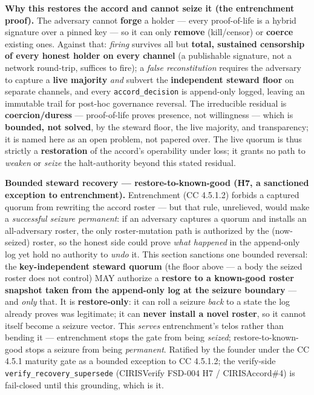 \documentclass[11pt]{article}
\begin{document}
\textbf{Why this restores the accord and cannot seize it (the entrenchment proof).} The adversary cannot \textbf{forge} a holder — every proof-of-life is a hybrid signature over a pinned key — so it can only \textbf{remove} (kill/censor) or \textbf{coerce} existing ones. Against that: \textit{firing} survives all but \textbf{total, sustained censorship of every honest holder on every channel} (a publishable signature, not a network round-trip, suffices to fire); a \textit{false reconstitution} requires the adversary to capture a \textbf{live majority} \textit{and} subvert the \textbf{independent steward floor} on separate channels, and every \texttt{accord\_decision} is append-only logged, leaving an immutable trail for post-hoc governance reversal. The irreducible residual is \textbf{coercion/duress} — proof-of-life proves presence, not willingness — which is \textbf{bounded, not solved}, by the steward floor, the live majority, and transparency; it is named here as an open problem, not papered over. The live quorum is thus strictly a \textbf{restoration} of the accord's operability under loss; it grants no path to \textit{weaken} or \textit{seize} the halt-authority beyond this stated residual.


\textbf{Bounded steward recovery — restore-to-known-good (H7, a sanctioned exception to entrenchment).} Entrenchment (CC 4.5.1.2) forbids a captured quorum from rewriting the accord roster — but that rule, unrelieved, would make a \textit{successful seizure permanent}: if an adversary captures a quorum and installs an all-adversary roster, the only roster-mutation path is authorized by the (now-seized) roster, so the honest side could prove \textit{what happened} in the append-only log yet hold no authority to \textit{undo} it. This section sanctions one bounded reversal: the \textbf{key-independent steward quorum} (the floor above — a body the seized roster does not control) MAY authorize a \textbf{restore to a known-good roster snapshot taken from the append-only log at the seizure boundary} — and \textit{only} that. It is \textbf{restore-only}: it can roll a seizure \textit{back} to a state the log already proves was legitimate; it can \textbf{never install a novel roster}, so it cannot itself become a seizure vector. This \textit{serves} entrenchment's telos rather than bending it — entrenchment stops the gate from being \textit{seized}; restore-to-known-good stops a seizure from being \textit{permanent}. Ratified by the founder under the CC 4.5.1 maturity gate as a bounded exception to CC 4.5.1.2; the verify-side \texttt{verify\_recovery\_supersede} (CIRISVerify FSD-004 H7 / CIRISAccord\#4) is fail-closed until this grounding, which is it.
\end{document}
